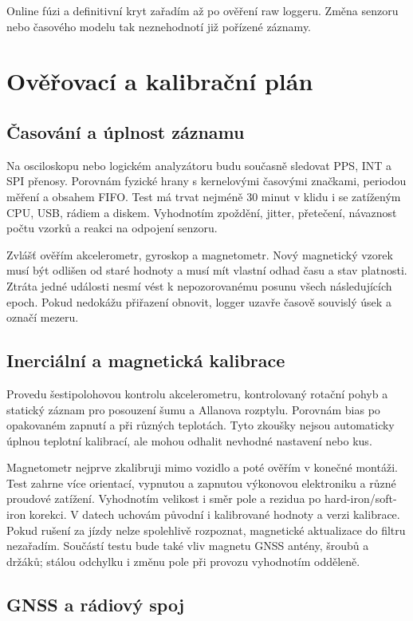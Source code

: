 Online fúzi a definitivní kryt zařadím až po ověření raw loggeru. Změna
senzoru nebo časového modelu tak neznehodnotí již pořízené záznamy.

\section{Ověřovací a kalibrační plán}

\subsection{Časování a úplnost záznamu}

Na osciloskopu nebo logickém analyzátoru budu současně sledovat PPS, INT
a SPI přenosy. Porovnám fyzické hrany s kernelovými časovými značkami,
periodou měření a obsahem FIFO. Test má trvat nejméně 30 minut v klidu
i se zatíženým CPU, USB, rádiem a diskem. Vyhodnotím zpoždění, jitter,
přetečení, návaznost počtu vzorků a reakci na odpojení senzoru.

Zvlášť ověřím akcelerometr, gyroskop a magnetometr. Nový magnetický vzorek
musí být odlišen od staré hodnoty a musí mít vlastní odhad času a stav
platnosti. Ztráta jedné události nesmí vést k nepozorovanému posunu všech
následujících epoch. Pokud nedokážu přiřazení obnovit, logger uzavře
časově souvislý úsek a označí mezeru.

\subsection{Inerciální a magnetická kalibrace}

Provedu šestipolohovou kontrolu akcelerometru, kontrolovaný rotační pohyb
a statický záznam pro posouzení šumu a Allanova rozptylu. Porovnám bias po
opakovaném zapnutí a při různých teplotách. Tyto zkoušky nejsou automaticky
úplnou teplotní kalibrací, ale mohou odhalit nevhodné nastavení nebo kus.

Magnetometr nejprve zkalibruji mimo vozidlo a poté ověřím v konečné montáži.
Test zahrne více orientací, vypnutou a zapnutou výkonovou elektroniku
a různé proudové zatížení. Vyhodnotím velikost i směr pole a rezidua po
hard-iron/soft-iron korekci. V datech uchovám původní i kalibrované hodnoty
a verzi kalibrace. Pokud rušení za jízdy nelze spolehlivě rozpoznat,
magnetické aktualizace do filtru nezařadím.
Součástí testu bude také vliv magnetu GNSS antény, šroubů a držáků;
stálou odchylku i změnu pole při provozu vyhodnotím odděleně.

\subsection{GNSS a rádiový spoj}

